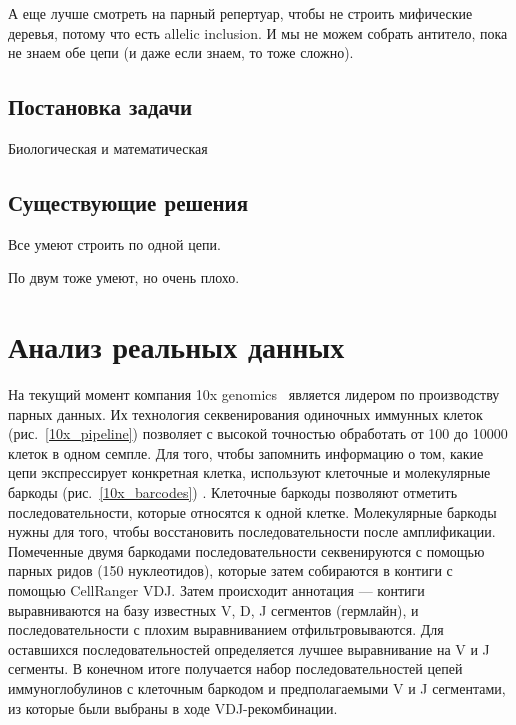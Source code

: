 \documentclass{spbau-diploma}
\begin{document}
А еще лучше смотреть на парный репертуар, чтобы не строить мифические деревья, потому что есть allelic inclusion. И мы не можем собрать антитело, пока не знаем обе цепи (и даже если знаем, то тоже сложно).



\subsection{Постановка задачи}

Биологическая и математическая




\subsection{Существующие решения}

Все умеют строить по одной цепи. 

По двум тоже умеют, но очень плохо.


\section{Анализ реальных данных}

На текущий момент компания 10x genomics~\cite{pmid28091601} является лидером по производству парных данных. Их технология секвенирования одиночных иммунных клеток (рис.~\ref{10x_pipeline}) позволяет с высокой точностью обработать от 100 до 10000 клеток в одном семпле. Для того, чтобы запомнить информацию о том, какие цепи экспрессирует конкретная клетка, используют клеточные и молекулярные баркоды (рис.~\ref{10x_barcodes}) . Клеточные баркоды позволяют отметить последовательности, которые относятся к одной клетке.  Молекулярные баркоды нужны для того, чтобы восстановить последовательности после амплификации. Помеченные двумя баркодами последовательности секвенируются с помощью парных ридов (150 нуклеотидов), которые затем собираются в контиги с помощью CellRanger VDJ. Затем происходит аннотация --- контиги выравниваются на базу известных V, D, J сегментов (гермлайн), и последовательности с плохим выравниванием отфильтровываются. Для оставшихся последовательностей определяется лучшее выравнивание на V и J сегменты. В конечном итоге получается набор последовательностей цепей иммуноглобулинов с клеточным баркодом и предполагаемыми V и J сегментами, из которые были выбраны в ходе VDJ-рекомбинации.
\end{document}
